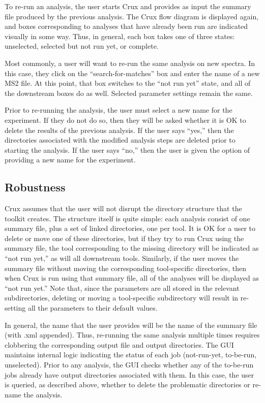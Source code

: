 \documentclass{article}
\begin{document}
To re-run an analysis, the user starts Crux and provides as input the
summary file produced by the previous analysis.  The Crux flow diagram
is displayed again, and boxes corresponding to analyses that have
already been run are indicated visually in some way.  Thus, in
general, each box takes one of three states: unselected, selected but
not run yet, or complete.

Most commonly, a user will want to re-run the same analysis on new
spectra.  In this case, they click on the ``search-for-matches'' box
and enter the name of a new MS2 file.  At this point, that box
switches to the ``not run yet'' state, and all of the downstream boxes
do as well.  Selected parameter settings remain the same.

Prior to re-running the analysis, the user must select a new name for
the experiment.  If they do not do so, then they will be asked whether
it is OK to delete the results of the previous analysis.  If the user
says ``yes,'' then the directories associated with the modified
analysis steps are deleted prior to starting the analysis.  If the
user says ``no,'' then the user is given the option of providing a new
name for the experiment.

\subsection{Robustness}

Crux assumes that the user will not disrupt the directory structure
that the toolkit creates.  The structure itself is quite simple: each
analysis consist of one summary file, plus a set of linked
directories, one per tool.  It is OK for a user to delete or move one
of these directories, but if they try to run Crux using the summary
file, the tool corresponding to the missing directory will be
indicated as ``not run yet,'' as will all downstream tools.
Similarly, if the user moves the summary file without moving the
corresponding tool-specific directories, then when Crux is run using
that summary file, all of the analyses will be displayed as ``not run
yet.''  Note that, since the parameters are all stored in the relevant
subdirectories, deleting or moving a tool-specific subdirectory will
result in re-setting all the parameters to their default values.

In general, the name that the user provides will be the name of the
summary file (with .xml appended).  Thus, re-running the same analysis
multiple times requires clobbering the corresponding output file and
output directories.  The GUI maintains internal logic indicating the
status of each job (not-run-yet, to-be-run, unselected).  Prior to any
analysis, the GUI checks whether any of the to-be-run jobs already
have output directories associated with them.  In this case, the user
is queried, as described above, whether to delete the problematic
directories or re-name the analysis.
\end{document}
